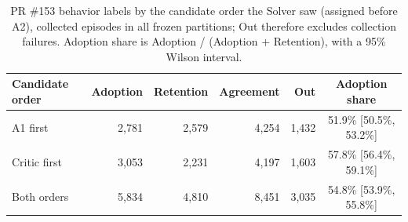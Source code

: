 \begin{table}[htbp]
    \centering
    \caption{PR \#153 behavior labels by the candidate order the Solver saw (assigned before A2), collected episodes in all frozen partitions; Out therefore excludes collection failures. Adoption share is Adoption / (Adoption + Retention), with a 95\% Wilson interval.}
    \label{tab:candidate-order-labels}
    \begin{tabular}{lrrrrc}
        \toprule
        Candidate order & Adoption & Retention & Agreement & Out & Adoption share \\
        \midrule
        A1 first & 2,781 & 2,579 & 4,254 & 1,432 & 51.9\% [50.5\%, 53.2\%] \\
        Critic first & 3,053 & 2,231 & 4,197 & 1,603 & 57.8\% [56.4\%, 59.1\%] \\
        \midrule
        Both orders & 5,834 & 4,810 & 8,451 & 3,035 & 54.8\% [53.9\%, 55.8\%] \\
        \bottomrule
    \end{tabular}
\end{table}
